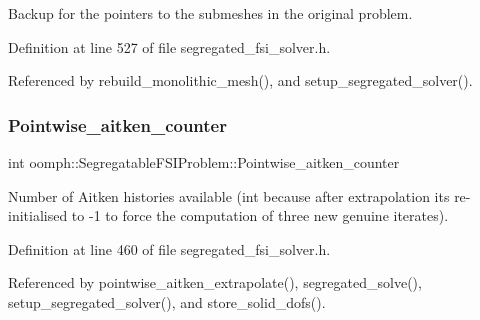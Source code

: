Backup for the pointers to the submeshes in the original problem. 



Definition at line 527 of file segregated\+\_\+fsi\+\_\+solver.\+h.



Referenced by rebuild\+\_\+monolithic\+\_\+mesh(), and setup\+\_\+segregated\+\_\+solver().

\mbox{\label{classoomph_1_1SegregatableFSIProblem_ad92eead7c5dc21884292a5a501c71388}} 
\subsubsection{\texorpdfstring{Pointwise\+\_\+aitken\+\_\+counter}{Pointwise\_aitken\_counter}}
{\footnotesize\ttfamily int oomph\+::\+Segregatable\+F\+S\+I\+Problem\+::\+Pointwise\+\_\+aitken\+\_\+counter\hspace{0.3cm}{\ttfamily [protected]}}



Number of Aitken histories available (int because after extrapolation it\textquotesingle{}s re-\/initialised to -\/1 to force the computation of three new genuine iterates). 



Definition at line 460 of file segregated\+\_\+fsi\+\_\+solver.\+h.



Referenced by pointwise\+\_\+aitken\+\_\+extrapolate(), segregated\+\_\+solve(), setup\+\_\+segregated\+\_\+solver(), and store\+\_\+solid\+\_\+dofs().

\mbox{\label{classoomph_1_1SegregatableFSIProblem_aa193977e4617aee9906e59bdd31f2263}} 
